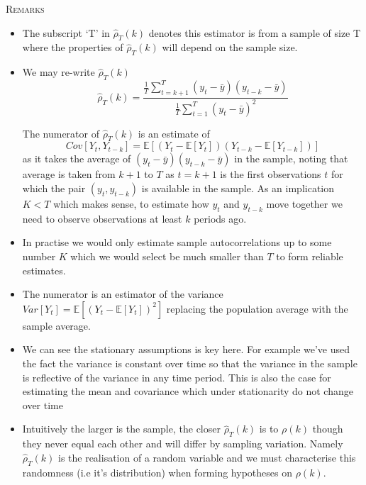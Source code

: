 \documentclass[openany]{tufte-book} %
\begin{document}
\textsc{Remarks}
\begin{itemize}
	\item The subscript `T' in $\hat{\rho}_T(k)$ denotes this estimator is from a sample of size T where the properties of  $\hat{\rho}_T(k)$  will depend on the sample size.
\item We may re-write $\hat{\rho}_T(k)$ 
\begin{equation}
\hat{\rho}_T(k)=\dfrac{\frac{1}{T}\sum_{t=k+1}^{T}\left( y_{t}-\bar{y}%
\right) \left( y_{t-k}-\bar{y}\right) }{\frac{1}{T}\sum_{t=1}^{T}\left( y_{t}-\bar{y}%
\right) ^{2}}  \label{sample autocorr}
\end{equation}%

 The numerator of $\hat{\rho}_T(k)$ is an estimate of
\begin{equation} Cov[Y_t,Y_{t-k}]=\mathbb{E}[(Y_t-\mathbb{E}[Y_t])(Y_{t-k}-\mathbb{E}[Y_{t-k}])] \end{equation}
as it  takes the  average of  $ \left( y_{t}-\bar{y}%
\right) \left( y_{t-k}-\bar{y}\right)$ in the sample, noting that average is taken  from $k+1$ to $T$ as $t=k+1$ is the first observations $t$
for which the pair $\left( y_{t},y_{t-k}\right) $ is available in the
sample. As an implication $K<T$ which makes sense, to estimate how $y_t$ and $y_{t-k}$ move together we need to observe observations at least $k$ periods ago.
\item In practise we would only estimate sample autocorrelations up to some number $K$ which we would select be much smaller than $T$ to form reliable estimates.  

\item The numerator is an estimator of the variance $Var[Y_t]=\mathbb{E}[(Y_t-\mathbb{E}[Y_t])^2]$ replacing the population average with the sample average.

\item We can see the stationary assumptions is key here. For example we've used the fact the variance is constant over time so that the variance in the sample is reflective of the variance in any time period. This is also the case for estimating the mean and covariance which under stationarity do not change over time

    \item Intuitively the larger is the sample, the closer $\hat{\rho}_T(k)$ is to $\rho(k)$ though they never equal each other and will differ by sampling variation. Namely $\hat{\rho}_T(k)$ is the realisation of a random variable and we must characterise this  randomness (i.e it's distribution) when forming hypotheses on $\rho(k)$.

        \end{itemize}
\end{document}
